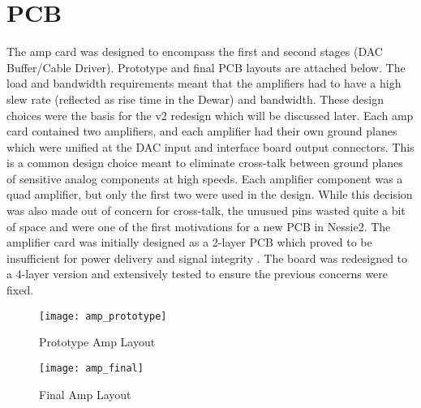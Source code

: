 \section{PCB}
The amp card was designed to encompass the first and second stages (DAC Buffer/Cable Driver). Prototype and final PCB layouts are attached below. The load and bandwidth requirements meant that the amplifiers had to have a high slew rate (reflected as rise time in the Dewar) and bandwidth. These design choices were the basis for the v2 redesign which will be discussed later. Each amp card contained two amplifiers, and each amplifier had their own ground planes which were unified at the DAC input and interface board output connectors. This is a common design choice meant to eliminate cross-talk between ground planes of sensitive analog components at high speeds. Each amplifier component was a quad amplifier, but only the first two were used in the design. While this decision was also made out of concern for cross-talk, the unusued pins wasted quite a bit of space and were one of the first motivations for a new PCB in Nessie2. The amplifier card was initially designed as a 2-layer PCB which proved to be insufficient for power delivery and signal integrity \cite{marks}. The board was redesigned to a 4-layer version and extensively tested to ensure the previous concerns were fixed. \par
\begin{figure}[!htb]
	\texttt{[image: amp\_prototype]}
	\centering
	\caption{Prototype Amp Layout}
	\centering
\end{figure}
\begin{figure}[!htb]
	\texttt{[image: amp\_final]}
	\centering
	\caption{Final Amp Layout}
	\centering
\end{figure}



